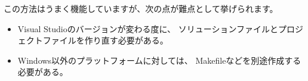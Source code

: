 \medskip
\noindent
\KLUDGE この方法はうまく機能していますが、次の点が難点として挙げられます。

\begin{itemize}
  \item	Visual Studio\KLUDGE のバージョンが変わる度に、
	\KLUDGE ソリューションファイルとプロジェクトファイルを作り直す必要がある。
  \item	Windows\KLUDGE 以外のプラットフォームに対しては、
	Makefile\KLUDGE などを別途作成する必要がある。
\end{itemize}

